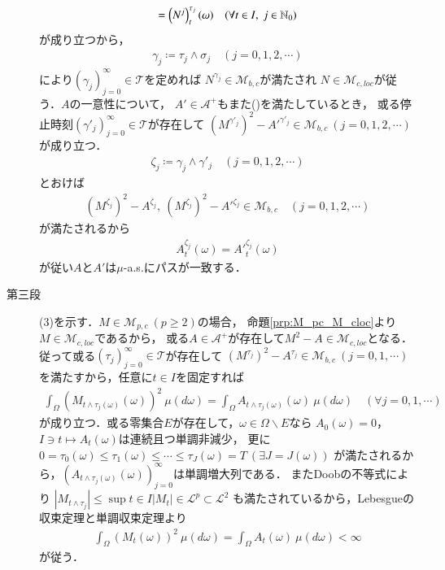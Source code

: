 \begin{prf}
\begin{description}
\begin{align}
					= \left( N^j \right)_t^{\tau_j}(\omega) \quad (\forall t \in I,\ j \in \mathbb{N}_0)
				\end{align}
				が成り立つから，
				\begin{align}
					\gamma_j \coloneqq \tau_j \wedge \sigma_j
					\quad (j=0,1,2,\cdots)
				\end{align}
				により$(\gamma_j)_{j=0}^{\infty} \in \mathcal{T}$を定めれば
				$N^{\gamma_j} \in \mathcal{M}_{b,c}$が満たされ
				$N \in \mathcal{M}_{c,loc}$が従う．$A$の一意性について，
				$A' \in \mathcal{A}^+$もまた()を満たしているとき，
				或る停止時刻$\left( \gamma'_j \right)_{j=0}^{\infty} \in \mathcal{T}$が存在して
				$\left( M^{\gamma'_j} \right)^2 - {A'}^{\gamma'_j} \in \mathcal{M}_{b,c}\ (j=0,1,2,\cdots)$が成り立つ．
				\begin{align}
					\zeta_j \coloneqq \gamma_j \wedge \gamma'_j
					\quad (j=0,1,2,\cdots)
				\end{align}
				とおけば
				\begin{align}
					\left( M^{\zeta_j} \right)^2 - A^{\zeta_j},\ \left( M^{\zeta_j} \right)^2 - {A'}^{\zeta_j} \in \mathcal{M}_{b,c}
					\quad (j=0,1,2,\cdots)
				\end{align}
				が満たされるから
				\begin{align}
					A_t^{\zeta_j} (\omega) = {A'}_t^{\zeta_j} (\omega)
				\end{align}
				が従い$A$と$A'$は$\mu$-a.s.にパスが一致する．
				
			\item[第三段]
				(3)を示す．$M \in \mathcal{M}_{p,c}\ (p \geq 2)$の場合，
				命題\ref{prp:M_pc_M_cloc}より$M \in \mathcal{M}_{c,loc}$であるから，
				或る$A \in \mathcal{A}^+$が存在して$M^2 - A \in \mathcal{M}_{c,loc}$となる．
				従って或る$(\tau_j)_{j=0}^{\infty} \in \mathcal{T}$が存在して
				$\left(M^{\tau_j} \right)^2 - A^{\tau_j} \in \mathcal{M}_{b,c}\ (j=0,1,\cdots)$
				を満たすから，任意に$t \in I$を固定すれば
				\begin{align}
					\int_{\Omega} \left( M_{t \wedge \tau_j(\omega)}(\omega) \right)^2\ \mu(d\omega)
					= \int_{\Omega} A_{t \wedge \tau_j(\omega)}(\omega)\ \mu(d\omega)
					\quad (\forall j=0,1,\cdots)
				\end{align}
				が成り立つ．或る零集合$E$が存在して，$\omega \in \Omega \backslash E$なら
				$A_0(\omega) = 0$，$I \ni t \longmapsto A_t(\omega)$は連続且つ単調非減少，
				更に$0 = \tau_0(\omega) \leq \tau_1(\omega) \leq \cdots \leq \tau_{J}(\omega) = T\ (\exists J = J(\omega))$
				が満たされるから，$\left(A_{t \wedge \tau_j(\omega)}(\omega)\right)_{j=0}^{\infty}$は単調増大列である．
				またDoobの不等式により
				$\left| M_{t \wedge \tau_j} \right| \leq \sup{t \in I}{|M_t|} \in \mathscr{L}^p \subset \mathscr{L}^2$
				も満たされているから，Lebesgueの収束定理と単調収束定理より
				\begin{align}
					\int_{\Omega} \left( M_t(\omega) \right)^2\ \mu(d\omega)
					= \int_{\Omega} A_t(\omega)\ \mu(d\omega) < \infty
				\end{align}
				が従う．
			

\end{description}
\end{prf}
